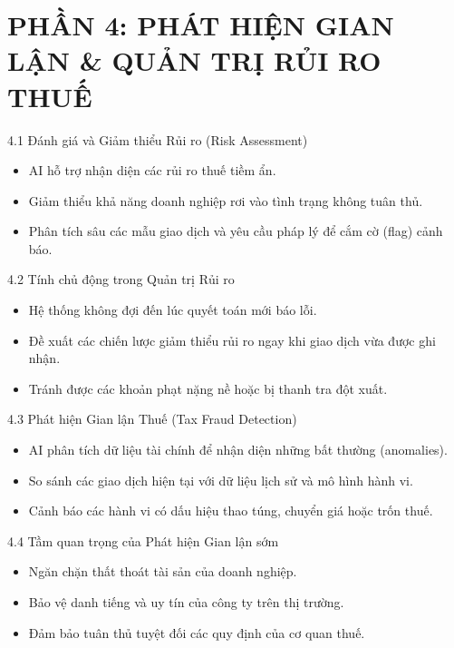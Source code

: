 \documentclass[aspectratio=169]{beamer}
\begin{document}
\section{PHẦN 4: PHÁT HIỆN GIAN LẬN \& QUẢN TRỊ RỦI RO THUẾ}


\begin{frame}{4.1 Đánh giá và Giảm thiểu Rủi ro (Risk Assessment)}
    \begin{itemize}
        \item AI hỗ trợ nhận diện các rủi ro thuế tiềm ẩn.
        \item Giảm thiểu khả năng doanh nghiệp rơi vào tình trạng không tuân thủ.
        \item Phân tích sâu các mẫu giao dịch và yêu cầu pháp lý để cắm cờ (flag) cảnh báo.
    \end{itemize}
\end{frame}


\begin{frame}{4.2 Tính chủ động trong Quản trị Rủi ro}
    \begin{itemize}
        \item Hệ thống không đợi đến lúc quyết toán mới báo lỗi.
        \item Đề xuất các chiến lược giảm thiểu rủi ro ngay khi giao dịch vừa được ghi nhận.
        \item Tránh được các khoản phạt nặng nề hoặc bị thanh tra đột xuất.
    \end{itemize}
\end{frame}


\begin{frame}{4.3 Phát hiện Gian lận Thuế (Tax Fraud Detection)}
    \begin{itemize}
        \item AI phân tích dữ liệu tài chính để nhận diện những bất thường (anomalies).
        \item So sánh các giao dịch hiện tại với dữ liệu lịch sử và mô hình hành vi.
        \item Cảnh báo các hành vi có dấu hiệu thao túng, chuyển giá hoặc trốn thuế.
    \end{itemize}
\end{frame}


\begin{frame}{4.4 Tầm quan trọng của Phát hiện Gian lận sớm}
    \begin{itemize}
        \item Ngăn chặn thất thoát tài sản của doanh nghiệp.
        \item Bảo vệ danh tiếng và uy tín của công ty trên thị trường.
        \item Đảm bảo tuân thủ tuyệt đối các quy định của cơ quan thuế.
    \end{itemize}
\end{frame}
\end{document}
